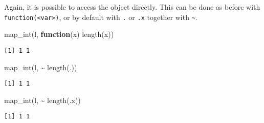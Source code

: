 \documentclass[ignorenonframetext,,t]{beamer}
\let\oldtextbf\textbf
\renewcommand{\textbf}[1]{\textcolor{spamwell}{\oldtextbf{#1}}}
\newenvironment{Shaded}{\begin{snugshade}}{\end{snugshade}}
\newcommand{\ControlFlowTok}[1]{\textcolor[rgb]{0.13,0.29,0.53}{\textbf{#1}}}
\newcommand{\FunctionTok}[1]{\textcolor[rgb]{0.00,0.00,0.00}{#1}}
\newcommand{\NormalTok}[1]{#1}
\newcommand{\SpecialCharTok}[1]{\textcolor[rgb]{0.00,0.00,0.00}{#1}}
\begin{document}
\begin{frame}[fragile]
Again, it is possible to access the object directly. This can be done as
before with \texttt{function(\textless{}var\textgreater{})}, or by
default with \texttt{.} or \texttt{.x} together with
\texttt{\textasciitilde{}}.

\begin{Shaded}
\begin{Highlighting}[]
\FunctionTok{map\_int}\NormalTok{(l, }\ControlFlowTok{function}\NormalTok{(x) }\FunctionTok{length}\NormalTok{(x))}
\end{Highlighting}
\end{Shaded}

\begin{verbatim}
[1] 1 1
\end{verbatim}

\begin{Shaded}
\begin{Highlighting}[]
\FunctionTok{map\_int}\NormalTok{(l, }\SpecialCharTok{\textasciitilde{}} \FunctionTok{length}\NormalTok{(.))}
\end{Highlighting}
\end{Shaded}

\begin{verbatim}
[1] 1 1
\end{verbatim}

\begin{Shaded}
\begin{Highlighting}[]
\FunctionTok{map\_int}\NormalTok{(l, }\SpecialCharTok{\textasciitilde{}} \FunctionTok{length}\NormalTok{(.x))}
\end{Highlighting}
\end{Shaded}

\begin{verbatim}
[1] 1 1
\end{verbatim}
\end{frame}
\end{document}
